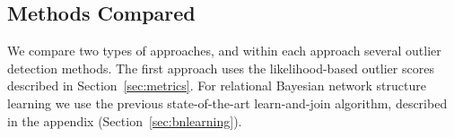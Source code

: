 \documentclass[conference]{IEEEtran}
\begin{document}
					\begin{table}
							\caption{Outlier/normal Objects in Real-World Datasets. }
							\label{MetricComputation}
						\centering
						
						\end{table}
						
%					
%					
																
						\subsection{Methods Compared}
						
						We compare two types of approaches, and within each approach several outlier detection methods. The first approach uses the likelihood-based outlier scores described in Section~\ref{sec:metrics}. For relational Bayesian network structure learning we use the previous state-of-the-art learn-and-join algorithm, described in the appendix (Section~\ref{sec:bnlearning}).
						
\end{document}
